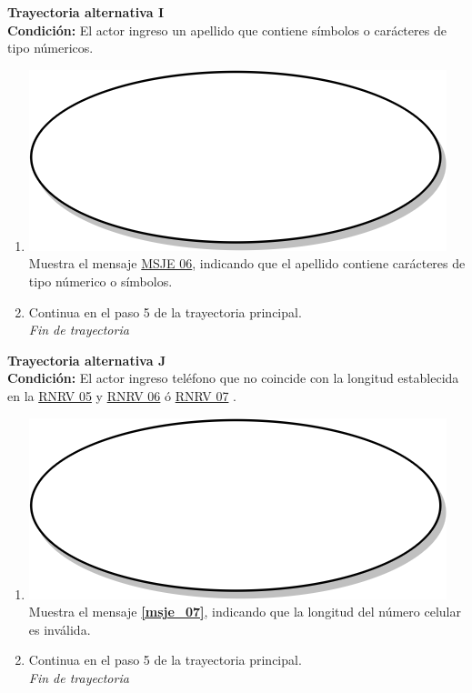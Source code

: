 \textbf{Trayectoria alternativa I} \label{cu2_ta_i}\\
\textbf{Condición:} El actor ingreso un apellido que contiene símbolos o carácteres de tipo númericos.\\
 \begin{enumerate}[label=I\arabic*]
    \item {\includegraphics[scale=.05]{Capitulo3/img/proceso.png} Muestra el mensaje \hyperref[msje_06]{MSJE 06}, indicando que el apellido contiene carácteres de tipo númerico o símbolos.}
    \item {Continua en el paso 5 de la trayectoria principal.} \\
    \textit{Fin de trayectoria} \\
\end{enumerate}

\textbf{Trayectoria alternativa J} \label{cu2_ta_j}\\
\textbf{Condición:} El actor ingreso teléfono que no coincide con la longitud establecida en la \hyperref[rnrv_05]{RNRV 05} y \hyperref[rnrv_06]{RNRV 06} ó \hyperref[rnrv_07]{RNRV 07} .\\
 \begin{enumerate}[label=J\arabic*]
    \item {\includegraphics[scale=.05]{Capitulo3/img/proceso.png} Muestra el mensaje \textbf{\ref{msje_07}}, indicando que la longitud del número celular es inválida.}
    \item {Continua en el paso 5 de la trayectoria principal.} \\
    \textit{Fin de trayectoria} \\
\end{enumerate}

